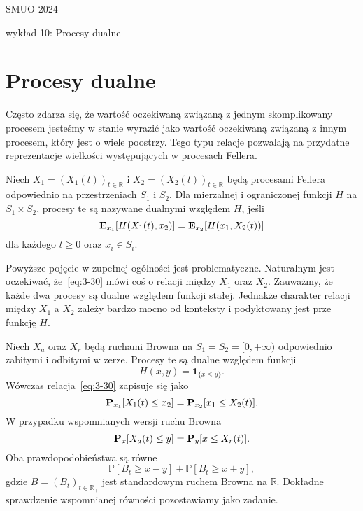 \documentclass{article}
\begin{document}
SMUO 2024

wykład 10: Procesy dualne

\section*{Procesy dualne}

	Często zdarza się, że wartość oczekiwaną związaną z jednym skomplikowany procesem
	jesteśmy w stanie wyrazić jako wartość oczekiwaną związaną z innym procesem, który jest 
	o wiele poostrzy.
	Tego typu relacje pozwalają na przydatne reprezentacje 
	wielkości występujących w procesach Fellera. 

	\begin{defn}\label{defn:3-41}
		Niech $X_1=(X_1(t))_{t \in \mathbb{R}}$ i $X_2=(X_2(t))_{t \in \mathbb{R}}$ 
		będą procesami Fellera odpowiednio na przestrzeniach $S_1$ i $S_2$. 
		Dla mierzalnej i ograniczonej funkcji $H$ na $S_1 \times S_2$, 
		procesy te są nazywane dualnymi względem $H$, jeśli
		\begin{equation}\label{eq:3-30}
			\mathbf{E}_{x_1} [H(X_1(t), x_2)] = \mathbf{E}_{x_2} [H(x_1, X_2(t))]
		\end{equation}
		dla każdego $t \geq 0$ oraz $x_i \in S_i$.
	\end{defn}

	Powyższe pojęcie w zupełnej ogólności jest problematyczne. 
	Naturalnym jest oczekiwać, że~\eqref{eq:3-30} mówi coś o relacji między
	$X_1$ oraz $X_2$. 
	Zauważmy, że każde dwa procesy są dualne względem funkcji stałej. 
	Jednakże charakter relacji między $X_1$ a $X_2$ zależy bardzo mocno
	od konteksty i podyktowany jest prze funkcję $H$.

	\begin{pd}
		Niech $X_a$ oraz $X_r$ będą ruchami Browna na $S_1=S_2=[0, +\infty)$ odpowiednio
		zabitymi i odbitymi w zerze. Procesy te są dualne względem funkcji
		\begin{equation*}
			H(x,y) = \mathbf{1}_{\{ x \leq y \}}.
		\end{equation*}
		Wówczas relacja~\eqref{eq:3-30} zapisuje się jako
		\begin{equation*}
			\mathbf{P}_{x_1}[X_1(t) \leq x_2] = \mathbf{P}_{x_2}[x_1 \leq X_2(t)].
		\end{equation*}
		W przypadku wspomnianych wersji ruchu Browna
		\begin{equation*}
			\mathbf{P}_{x}[X_a(t) \leq y] = \mathbf{P}_{y}[x \leq X_r(t)].
		\end{equation*}
		Oba prawdopodobieństwa są równe
		\begin{equation*}
			\mathbb{P}[B_t\geq x-y]+ \mathbb{P}[B_t\geq x+y],
		\end{equation*}
		gdzie $B=(B_t)_{t \in \mathbb{R}_+}$ jest standardowym ruchem Browna na $\mathbb{R}$.
		Dokładne sprawdzenie wspomnianej równości pozostawiamy jako zadanie.
	\end{pd}
\end{document}
